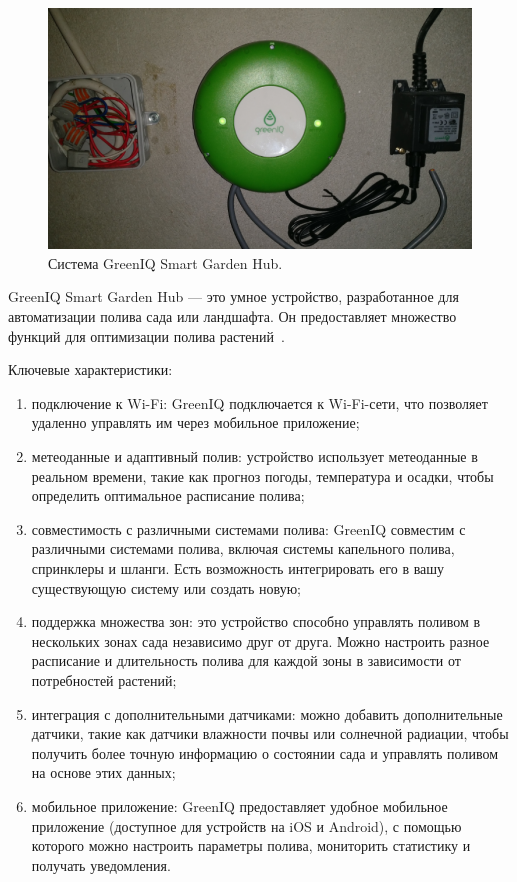 \begin{figure}[H]
    \centering
    \includegraphics[scale=0.5]{images/GreenIQSmartGardenHub.png}
    \caption{Система GreenIQ Smart Garden Hub.}
    \label{fig:GreenIQSmartGardenHub}
\end{figure}

GreenIQ Smart Garden Hub --- это умное устройство, разработанное для автоматизации полива сада или ландшафта. Он предоставляет множество функций для оптимизации полива растений~\cite{GreenIQ}.

Ключевые характеристики:

\begin{enumerate}
    \item подключение к Wi-Fi: GreenIQ подключается к Wi-Fi-сети, что позволяет удаленно управлять им через мобильное приложение;
    \item метеоданные и адаптивный полив: устройство использует метеоданные в реальном времени, такие как прогноз погоды, температура и осадки, чтобы определить оптимальное расписание полива;
    \item совместимость с различными системами полива: GreenIQ совместим с различными системами полива, включая системы капельного полива, спринклеры и шланги. Есть возможность интегрировать его в вашу существующую систему или создать новую;
    \item поддержка множества зон: это устройство способно управлять поливом в нескольких зонах сада независимо друг от друга. Можно настроить разное расписание и длительность полива для каждой зоны в зависимости от потребностей растений;
    \item интеграция с дополнительными датчиками: можно добавить дополнительные датчики, такие как датчики влажности почвы или солнечной радиации, чтобы получить более точную информацию о состоянии сада и управлять поливом на основе этих данных;
    \item мобильное приложение: GreenIQ предоставляет удобное мобильное приложение (доступное для устройств на iOS и Android), с помощью которого можно настроить параметры полива, мониторить статистику и получать уведомления.
\end{enumerate}

